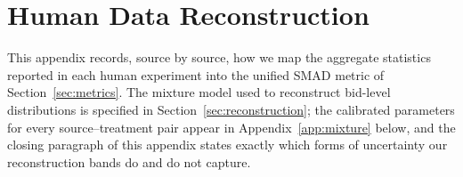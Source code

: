 \section{Human Data Reconstruction}\label{app:human}

This appendix records, source by source, how we map the aggregate statistics reported in each human experiment into the unified SMAD metric of Section~\ref{sec:metrics}. The mixture model used to reconstruct bid-level distributions is specified in Section~\ref{sec:reconstruction}; the calibrated parameters for every source--treatment pair appear in Appendix~\ref{app:mixture} below, and the closing paragraph of this appendix states exactly which forms of uncertainty our reconstruction bands do and do not capture.

